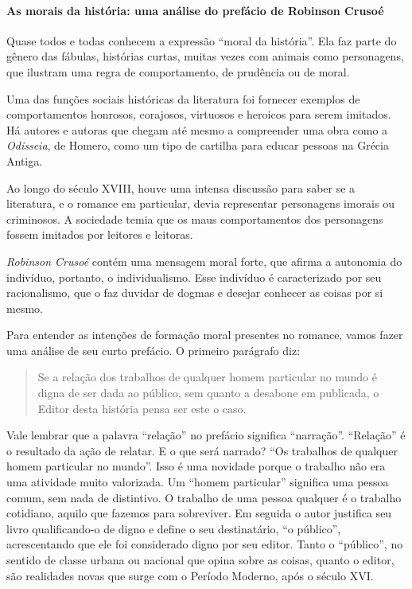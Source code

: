 \documentclass[12pt]{extarticle}
\begin{document}
\paragraph{As morais da história: uma análise do prefácio de Robinson Crusoé}
Quase todos e todas conhecem a expressão ``moral da história''. Ela faz
parte do gênero das fábulas, histórias curtas, muitas vezes com animais
como personagens, que ilustram uma regra de comportamento, de prudência
ou de moral.

Uma das funções sociais históricas da literatura foi fornecer exemplos
de comportamentos honrosos, corajosos, virtuosos e heroicos para serem
imitados. Há autores e autoras que chegam até mesmo a compreender uma
obra como a \emph{Odisseia}, de Homero, como um tipo de cartilha para
educar pessoas na Grécia Antiga.

Ao longo do século XVIII, houve uma intensa discussão para saber se a
literatura, e o romance em particular, devia representar personagens
imorais ou criminosos. A sociedade temia que os maus comportamentos dos
personagens fossem imitados por leitores e leitoras.

\emph{Robinson Crusoé} contém uma mensagem moral forte, que afirma a
autonomia do indivíduo, portanto, o individualismo. Esse indivíduo é
caracterizado por seu racionalismo, que o faz duvidar de dogmas e
desejar conhecer as coisas por si mesmo.

Para entender as intenções de formação moral presentes no romance, vamos
fazer uma análise de seu curto prefácio. O primeiro parágrafo diz:

\begin{quote}
Se a relação dos trabalhos de qualquer homem particular no mundo é
digna de ser dada ao público, sem quanto a desabone em publicada, o
Editor desta história pensa ser este o caso.
\end{quote}

Vale lembrar que a palavra ``relação'' no prefácio significa
``narração''. ``Relação'' é o resultado da ação de relatar. E o que será narrado? ``Os trabalhos de qualquer homem particular no
mundo''. Isso é uma novidade porque o trabalho não era uma atividade
muito valorizada. Um ``homem particular'' significa uma pessoa comum,
sem nada de distintivo. O trabalho de uma pessoa qualquer é o trabalho
cotidiano, aquilo que fazemos para sobreviver. Em seguida o autor
justifica seu livro qualificando-o de digno e define o seu destinatário,
``o público'', acrescentando que ele foi considerado digno por seu
editor. Tanto o ``público'', no sentido de classe urbana ou nacional que
opina sobre as coisas, quanto o editor, são realidades novas que surge
com o Período Moderno, após o século XVI.
\end{document}
